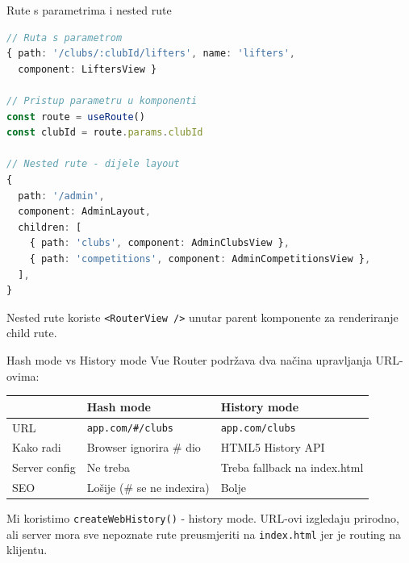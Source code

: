\begin{frame}[fragile,shrink=5]{Rute s parametrima i nested rute}
\begin{lstlisting}[language=typescript]
// Ruta s parametrom
{ path: '/clubs/:clubId/lifters', name: 'lifters',
  component: LiftersView }

// Pristup parametru u komponenti
const route = useRoute()
const clubId = route.params.clubId

// Nested rute - dijele layout
{
  path: '/admin',
  component: AdminLayout,
  children: [
    { path: 'clubs', component: AdminClubsView },
    { path: 'competitions', component: AdminCompetitionsView },
  ],
}
\end{lstlisting}

\vspace{0.4em}
Nested rute koriste \texttt{<RouterView />} unutar parent komponente za renderiranje child rute.
\end{frame}

\begin{frame}{Hash mode vs History mode}
Vue Router podržava dva načina upravljanja URL-ovima:

\vspace{0.4em}
\begin{tabular}{@{}lp{5cm}p{5cm}@{}}
  \toprule
  & \textbf{Hash mode} & \textbf{History mode} \\
  \midrule
  URL & \texttt{app.com/\#/clubs} & \texttt{app.com/clubs} \\
  Kako radi & Browser ignorira \# dio & HTML5 History API \\
  Server config & Ne treba & Treba fallback na index.html \\
  SEO & Lošije (\# se ne indexira) & Bolje \\
  \bottomrule
\end{tabular}

\vspace{0.6em}
Mi koristimo \texttt{createWebHistory()} - history mode. URL-ovi izgledaju prirodno, ali server mora sve nepoznate rute preusmjeriti na \texttt{index.html} jer je routing na klijentu.
\end{frame}

